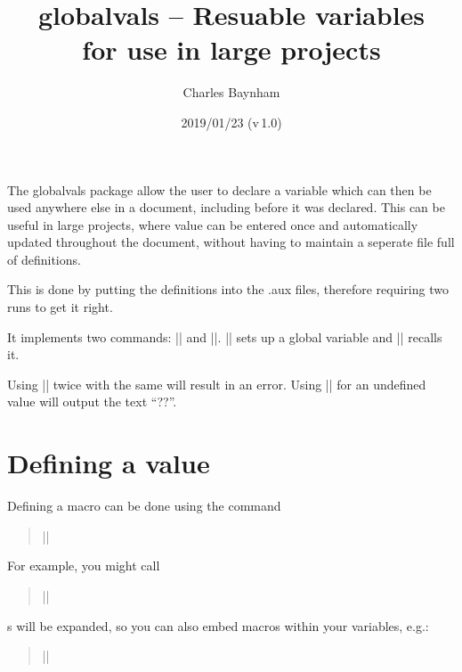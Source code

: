 \documentclass[a4paper]{ltxdoc}
\begin{document}
\title{\textsf{globalvals} -- Resuable variables \\ 
for use in large projects}
\author{Charles Baynham}
\date{2019/01/23 (v\,1.0)}
\maketitle

\noindent
The \textsf{globalvals} package allow the user to declare a variable which can then be used anywhere else in a document, including before it was declared. This can be useful in large projects, where value can be entered once and automatically updated throughout the document, without having to maintain a seperate file full of definitions. 

This is done by putting the definitions into the .aux files, therefore requiring two runs to get it right.

It implements two commands: || and ||. ||
sets up a global variable and |\useVal| recalls it.

Using || twice with the same  will result in an error. Using |\useVal| for an undefined
value will output the text ``\textsc{??}''.

\section{Defining a value}
\label{sec:defining}

%
Defining a macro can be done using the command 
\begin{quote}
	||
\end{quote}

For example, you might call 
\begin{quote}
	||
\end{quote}

s will be expanded, so you can also embed macros within your variables, e.g.:
\begin{quote}
	||
\end{quote}
\end{document}
